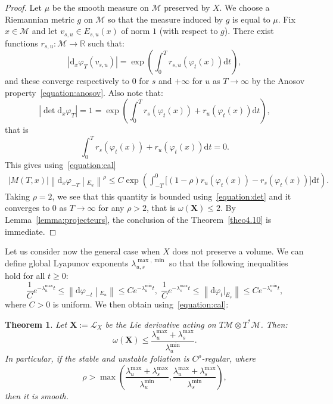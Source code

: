 \documentclass[10pt]{amsart}
\newtheorem{theo}{Theorem}[section]
\theoremstyle{definition}\newtheorem{defi}[theo]{Definition}\newtheorem{rema}[theo]{Remark}\newtheorem{exam}[theo]{Example}\newtheorem{exem}[theo]{Example}\newtheorem{nota}[theo]{Notation}
\newcommand{\R}{\mathbb{R}}
\newcommand{\X}{\mathbf{X}}
\newcommand{\mc}{\mathcal}
\newcommand{\M}{\mathcal{M}}
\newcommand{\dd}{\mathrm{d}}
\begin{document}
\begin{proof}
Let $\mu$ be the smooth measure on $\M$ preserved by $X$. We choose a Riemannian metric $g$ on $\M$ so that the measure induced by $g$ is equal to $\mu$. Fix $x \in \M$ and let $v_{s,u} \in E_{s,u}(x)$ of norm $1$ (with respect to $g$). There exist functions $r_{s,u} : \M \rightarrow \R$ such that:
\[
\left|\dd_x \varphi_T(v_{s,u})\right| = \exp \left(\int_0^T r_{s,u}(\varphi_t(x)) \dd t\right),
\]
and these converge respectively to $0$ for $s$ and $+\infty$ for $u$ as $T \rightarrow \infty$ by the Anosov property~\eqref{equation:anosov}. Also note that:
\[
\left|\det \dd_x \varphi_T\right| = 1 = \exp \left(\int_0^T r_{s}(\varphi_t(x)) + r_{u}(\varphi_t(x)) \dd t\right),
\]
that is
\begin{equation}\label{equation:det}
\int_0^T r_{s}(\varphi_t(x)) + r_{u}(\varphi_t(x)) \dd t = 0.
\end{equation}
This gives using~\eqref{equation:cal}
\begin{align*}
|M(T,x)| \left\|\dd_x \varphi_{-T}\middle|_{E_u}\right\|^\rho \leq C \exp\left(\int_{-T}^0 \big[(1-\rho) r_u(\varphi_t (x)) - r_s(\varphi_t(x))\big] \dd t\right).
\end{align*}
Taking $\rho = 2$, we see that this quantity is bounded using~\eqref{equation:det} and it converges to $0$ as $T \rightarrow \infty$ for any $\rho > 2$, that is $\omega(\X) \leq 2$. By Lemma~\ref{lemma:projecteurs}, the conclusion of the Theorem~\ref{theo4.10} is immediate.
\end{proof}


Let us consider now the general case when $X$ does not preserve a volume. We can define global Lyapunov exponents $\lambda^{\max,\min}_{u,s}$ so that the following inequalities hold for all $t \geq 0$:
\[
\frac{1}{C} e^{-\lambda^{\max}_u t} \leq \left\| \dd\varphi_{-t}\middle|_{E_u}\right\| \leq Ce^{-\lambda^{\min}_u t},\;\frac{1}{C} e^{-\lambda^{\max}_s t} \leq \left\| \dd\varphi_{t}|_{E_s}\right\| \leq Ce^{-\lambda^{\min}_s t},
\]
where $C > 0$ is uniform. We then obtain using~\eqref{equation:cal}:

\begin{theo}\label{theorem:rigidity-foliation}
Let $\X := \mc{L}_X$ be the Lie derivative acting on $T\M \otimes T^*\M$. Then:
\[
\omega(\X) \leq \dfrac{\lambda^{\max}_u + \lambda^{\max}_s}{\lambda^{\min}_u}.
\]
In particular, if the stable and unstable foliation is $C^\rho$-regular, where
\[
\rho > \max\left(\dfrac{\lambda^{\max}_u + \lambda^{\max}_s}{\lambda^{\min}_u}, \dfrac{\lambda^{\max}_u + \lambda^{\max}_s}{\lambda^{\min}_s} \right),
\]
then it is smooth.
\end{theo}
\end{document}
